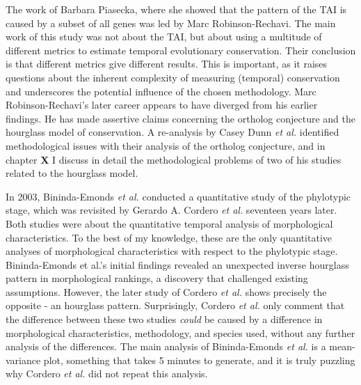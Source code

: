 The work of Barbara Piasecka, where she showed that the pattern of the TAI is caused by a subset of all genes was led by Marc Robinson-Rechavi. The main work of this study was not about the TAI, but about using a multitude of different metrics to estimate temporal evolutionary conservation. Their conclusion is that different metrics give different results. This is important, as it raises questions about the inherent complexity of measuring (temporal) conservation and underscores the potential influence of the chosen methodology. Marc Robinson-Rechavi's later career appears to have diverged from his earlier findings. He has made assertive claims concerning the ortholog conjecture\cite{KryuchkovaMostacci2016} and the hourglass model of conservation\cite{Liu2020,Liu2021,marletaz2018}. A re-analysis by Casey Dunn \textit{et al.} identified methodological issues with their analysis of the ortholog conjecture\cite{Dunn2018}, and in chapter \textbf{X} I discuss in detail the methodological problems of two of his studies related to the hourglass model.

In 2003, Bininda-Emonds \textit{et al.} conducted a quantitative study of the phylotypic stage, which was revisited by Gerardo A. Cordero \textit{et al.} seventeen years later\cite{OlafRP2003, Cordero2020}. Both studies were about the quantitative temporal analysis of morphological characteristics. To the best of my knowledge, these are the only quantitative analyses of morphological characteristics with respect to the phylotypic stage. Bininda-Emonds et al.'s initial findings revealed an unexpected inverse hourglass pattern in morphological rankings, a discovery that challenged existing assumptions. However, the later study of Cordero \textit{et al.} shows precisely the opposite - an hourglass pattern. Surprisingly, Cordero \textit{et al.} only comment that the difference between these two studies \textit{could} be caused by a difference in morphological characteristics, methodology, and species used, without any further analysis of the differences. The main analysis of Bininda-Emonds \textit{et al.} is a mean-variance plot, something that takes 5 minutes to generate, and it is truly puzzling why Cordero \textit{et al.} did not repeat this analysis.

